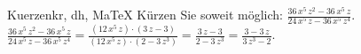 \begin{MAufgabe}{Kuerzen}{kr, dh, MaTeX}
K\"urzen Sie soweit m\"oglich: $\frac{36\, x^5\, z^2 - 36\, x^5\, z}{24\, x^5\, z - 36\, x^5\, z^4}$.\\ 
\ifLsg\MLoesung
\quad $\frac{36\, x^5\, z^2 - 36\, x^5\, z}{24\, x^5\, z - 36\, x^5\, z^4}=\frac{(12\, x^5\, z)\cdot(3\, z - 3)}{(12\, x^5\, z)\cdot(2 - 3\, z^3)}=\frac{3\, z - 3}{2 - 3\, z^3}=\frac{3 - 3\, z}{3\, z^3 - 2}$.\else\relax\fi
 \end{MAufgabe}